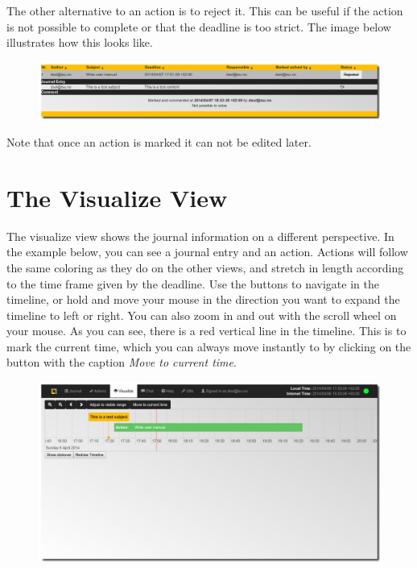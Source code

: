 \documentclass[letterpaper,10pt,english]{sphinxmanual}
\begin{document}
The other alternative to an action is to reject it. This can be useful if the action is not possible to complete or that the deadline is too strict. The image below illustrates how this looks like.
\begin{figure}[htbp]
\centering

\includegraphics{actions7.png}
\end{figure}

Note that once an action is marked it can not be edited later.


\section{The Visualize View}
\label{User manual:the-visualize-view}
The visualize view shows the journal information on a different perspective. In the example below, you can see a journal entry and an action. Actions will follow the same coloring as they do on the other views, and stretch in length according to the time frame given by the deadline. Use the buttons to navigate in the timeline, or hold and move your mouse in the direction you want to expand the timeline to left or right. You can also zoom in and out with the scroll wheel on your mouse. As you can see, there is a red vertical line in the timeline. This is to mark the current time, which you can always move instantly to by clicking on the button with the caption \emph{Move to current time}.
\begin{figure}[htbp]
\centering

\includegraphics{visualize.png}
\end{figure}
\end{document}
